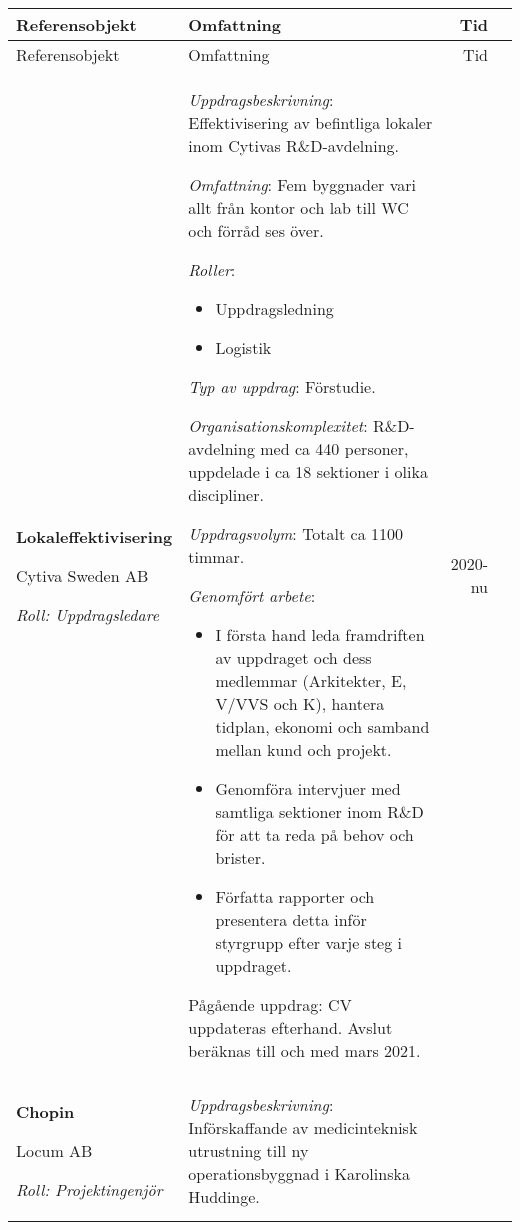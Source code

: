 \documentclass[a4paper, 10pt]{article}
\begin{document}
\begin{longtable}{@{\extracolsep{\fill}}p{} p{} Rp{0.1\textwidth}}
    {\large Referensobjekt} & {\large Omfattning} & {\large Tid} \\
    \toprule
    \endfirsthead

    {\large Referensobjekt} & {\large Omfattning} & {\large Tid} \\
    \toprule
    \endhead

    \bottomrule
    \endlastfoot

    \textbf{Lokaleffektivisering}

    Cytiva Sweden AB

    \textit{Roll: Uppdragsledare}
    &
    \textit{Uppdragsbeskrivning}: Effektivisering av befintliga lokaler inom Cytivas R\&D-avdelning.

    \textit{Omfattning}: Fem byggnader vari allt från kontor och lab till WC och förråd ses över. 

    \textit{Roller}: 
    \begin{itemize}
        \item Uppdragsledning
        \item Logistik
    \end{itemize}
    \textit{Typ av uppdrag}: Förstudie.

    \textit{Organisationskomplexitet}: R\&D-avdelning med ca 440 personer, uppdelade i ca 18 sektioner i olika discipliner.

    \textit{Uppdragsvolym}: Totalt ca 1100 timmar.

    \textit{Genomfört arbete}: 
    \begin{itemize}
        \item I första hand leda framdriften av uppdraget och dess medlemmar (Arkitekter, E, V/VVS och K), hantera tidplan, ekonomi och samband mellan kund och projekt.
        \item Genomföra intervjuer med samtliga sektioner inom R\&D för att ta reda på behov och brister.
        \item Författa rapporter och presentera detta inför styrgrupp efter varje steg i uppdraget.
    \end{itemize}
    Pågående uppdrag: CV uppdateras efterhand. Avslut beräknas till och med mars 2021.
    &
    2020-nu
    \\ \midrule
    \textbf{Chopin}

    Locum AB

    \textit{Roll: Projektingenjör}
    &
    \textit{Uppdragsbeskrivning}: Införskaffande av medicinteknisk utrustning till ny operationsbyggnad i Karolinska Huddinge.


\end{longtable}
\end{document}
